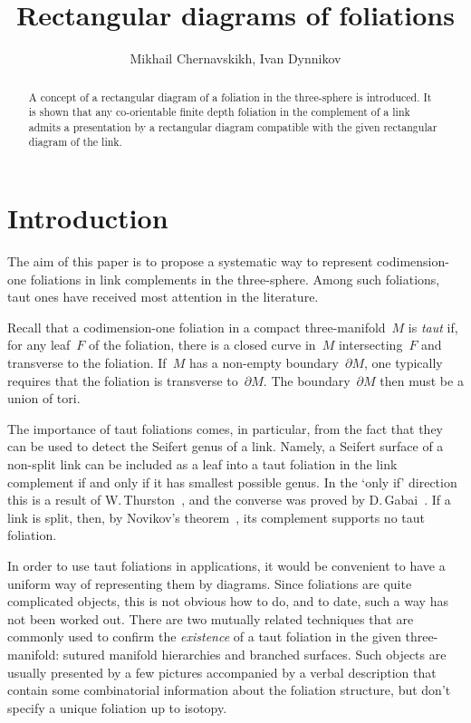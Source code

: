 \documentclass{amsart}
\date{}
\author{Mikhail Chernavskikh, Ivan Dynnikov}
\title{Rectangular diagrams of foliations}
\theoremstyle{theorem}
\theoremstyle{remark}
\theoremstyle{definition}
\numberwithin{equation}{section}
\numberwithin{figure}{section}
\begin{document}
\maketitle

\begin{abstract}
A concept of a rectangular diagram of a foliation in the three-sphere
is introduced. It is shown that any co-orientable finite depth foliation in
the complement of a link admits a presentation by a rectangular diagram
compatible with the given rectangular diagram of the link.
\end{abstract}

\tableofcontents

\section{Introduction}
The aim of this paper is to propose a systematic way to represent
codimension-one foliations in link complements in the three-sphere. Among such foliations,
taut ones have received most attention in the literature.

Recall that a codimension-one foliation in a compact three-manifold~$M$ is \emph{taut}
if, for any leaf~$F$ of the foliation, there is a closed curve in~$M$
intersecting~$F$ and transverse to the foliation. If~$M$
has a non-empty boundary~$\partial M$, one typically requires that
the foliation is transverse to~$\partial M$. The boundary~$\partial M$
then must be a union of tori.

The importance of taut foliations comes, in particular,
from the fact that they can be used to detect the Seifert
genus of a link. Namely, a Seifert surface of a non-split link
can be included as a leaf into a taut foliation in the link
complement if and only if it has smallest possible genus.
In the `only if' direction this is a result of W.\,Thurston~\cite{thurston86},
and the converse was proved by D.\,Gabai~\cite{gabai83}.
If a link is split, then, by Novikov's theorem~\cite{novikov65}, its
complement supports no taut foliation.

In order to use taut foliations in applications, it would
be convenient to have a uniform way of representing them
by diagrams. Since foliations are quite complicated objects,
this is not obvious how to do, and to date, such a way has not been worked out. There
are two mutually related techniques that are commonly used
to confirm the \emph{existence} of a taut foliation in the given three-manifold:
sutured manifold hierarchies and branched surfaces. Such objects are usually presented
by a few pictures accompanied by a verbal description that contain
some combinatorial information about the foliation structure, but don't
specify a unique foliation up to isotopy.
\end{document}
